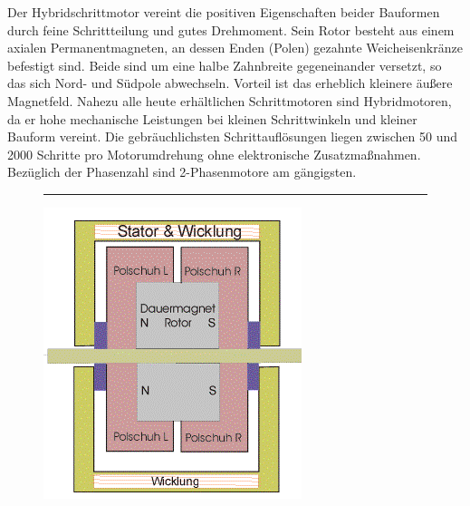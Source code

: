 \begin{description}[leftmargin=3cm]
							\item[Hybridschrittmotor]
							Der Hybridschrittmotor vereint die positiven Eigenschaften beider Bauformen durch feine Schrittteilung und gutes Drehmoment. Sein Rotor besteht aus einem axialen Permanentmagneten, an dessen Enden (Polen) gezahnte Weicheisenkränze befestigt sind. Beide sind um eine halbe Zahnbreite gegeneinander versetzt, so das sich Nord- und Südpole abwechseln. Vorteil ist das erheblich kleinere äußere Magnetfeld. Nahezu alle heute erhältlichen Schrittmotoren sind Hybridmotoren, da er hohe mechanische Leistungen bei kleinen Schrittwinkeln und kleiner Bauform vereint. Die gebräuchlichsten Schrittauflösungen liegen zwischen 50 und 2000 Schritte pro Motorumdrehung ohne elektronische Zusatzmaßnahmen. Bezüglich der Phasenzahl sind 2-Phasenmotore am gängigsten.
							\begin{figure}[h]
								\centering \rule{1.5cm}{0cm}
								\includegraphics[width=0.4\linewidth]{./pics/el/hybrid}
							\end{figure}
						

\end{description}
